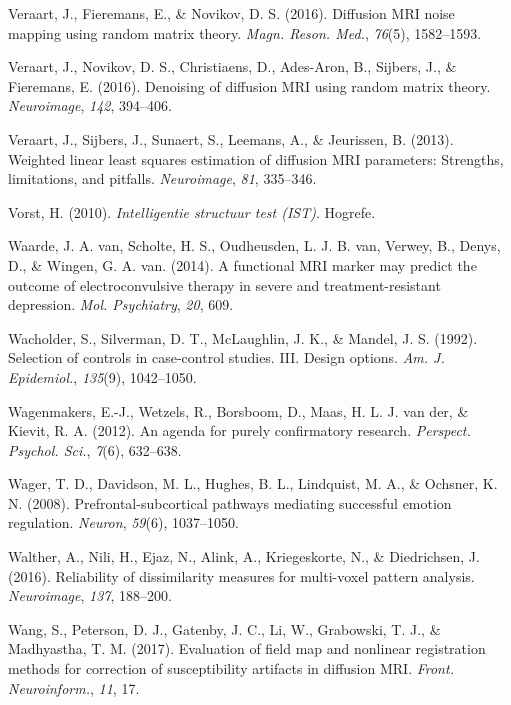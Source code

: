 \documentclass[11pt,american,a4paper,oneside,]{memoir} %
\begin{document}
\leavevmode\hypertarget{ref-Veraart2016-zi}{}%
Veraart, J., Fieremans, E., \& Novikov, D. S. (2016). Diffusion MRI noise mapping using random matrix theory. \emph{Magn. Reson. Med.}, \emph{76}(5), 1582--1593.

\leavevmode\hypertarget{ref-Veraart2016-rv}{}%
Veraart, J., Novikov, D. S., Christiaens, D., Ades-Aron, B., Sijbers, J., \& Fieremans, E. (2016). Denoising of diffusion MRI using random matrix theory. \emph{Neuroimage}, \emph{142}, 394--406.

\leavevmode\hypertarget{ref-Veraart2013-ya}{}%
Veraart, J., Sijbers, J., Sunaert, S., Leemans, A., \& Jeurissen, B. (2013). Weighted linear least squares estimation of diffusion MRI parameters: Strengths, limitations, and pitfalls. \emph{Neuroimage}, \emph{81}, 335--346.

\leavevmode\hypertarget{ref-Vorst2010-ex}{}%
Vorst, H. (2010). \emph{Intelligentie structuur test (IST)}. Hogrefe.

\leavevmode\hypertarget{ref-Van_Waarde2014-sh}{}%
Waarde, J. A. van, Scholte, H. S., Oudheusden, L. J. B. van, Verwey, B., Denys, D., \& Wingen, G. A. van. (2014). A functional MRI marker may predict the outcome of electroconvulsive therapy in severe and treatment-resistant depression. \emph{Mol. Psychiatry}, \emph{20}, 609.

\leavevmode\hypertarget{ref-Wacholder1992-wb}{}%
Wacholder, S., Silverman, D. T., McLaughlin, J. K., \& Mandel, J. S. (1992). Selection of controls in case-control studies. III. Design options. \emph{Am. J. Epidemiol.}, \emph{135}(9), 1042--1050.

\leavevmode\hypertarget{ref-Wagenmakers2012-vd}{}%
Wagenmakers, E.-J., Wetzels, R., Borsboom, D., Maas, H. L. J. van der, \& Kievit, R. A. (2012). An agenda for purely confirmatory research. \emph{Perspect. Psychol. Sci.}, \emph{7}(6), 632--638.

\leavevmode\hypertarget{ref-wager2008prefrontal}{}%
Wager, T. D., Davidson, M. L., Hughes, B. L., Lindquist, M. A., \& Ochsner, K. N. (2008). Prefrontal-subcortical pathways mediating successful emotion regulation. \emph{Neuron}, \emph{59}(6), 1037--1050.

\leavevmode\hypertarget{ref-Walther2016-je}{}%
Walther, A., Nili, H., Ejaz, N., Alink, A., Kriegeskorte, N., \& Diedrichsen, J. (2016). Reliability of dissimilarity measures for multi-voxel pattern analysis. \emph{Neuroimage}, \emph{137}, 188--200.

\leavevmode\hypertarget{ref-Wang2017-nk}{}%
Wang, S., Peterson, D. J., Gatenby, J. C., Li, W., Grabowski, T. J., \& Madhyastha, T. M. (2017). Evaluation of field map and nonlinear registration methods for correction of susceptibility artifacts in diffusion MRI. \emph{Front. Neuroinform.}, \emph{11}, 17.
\end{document}
